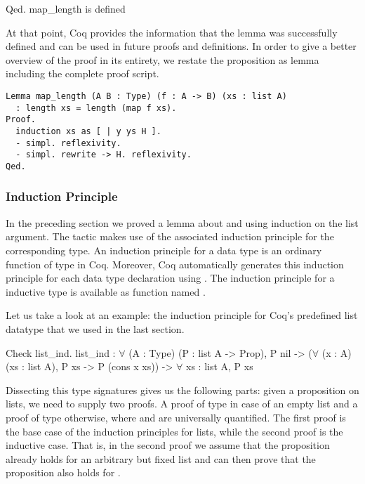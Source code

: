 \begin{cproof}{Qed.}
map_length is defined
\end{cproof}

At that point, Coq provides the information that the lemma  was successfully defined and can be used in future proofs and definitions.
In order to give a better overview of the proof in its entirety, we restate the proposition as lemma including the complete proof script.

\begin{verbatim}
Lemma map_length (A B : Type) (f : A -> B) (xs : list A)
  : length xs = length (map f xs).
Proof.
  induction xs as [ | y ys H ].
  - simpl. reflexivity.
  - simpl. rewrite -> H. reflexivity.
Qed.
\end{verbatim}

\subsubsection{Induction Principle}
\label{subsub:induction}

In the preceding section we proved a lemma about  and  using induction on the list argument.
The  tactic makes use of the associated induction principle for the corresponding type.
An induction principle for a data type is an ordinary function of type  in Coq.
Moreover, Coq automatically generates this induction principle for each data type declaration using .
The induction principle for a inductive type  is available as function named .

Let us take a look at an example: the induction principle for Coq's predefined list datatype that we used in the last section.

\begin{crepl}
\coqrepl Check list_ind.
  list_ind : \(\forall\) (A : Type) (P : list A -> Prop),
    P nil ->
    (\(\forall\) (x : A) (xs : list A), P xs -> P (cons x xs)) ->
    \(\forall\) xs : list A, P xs
\end{crepl}

Dissecting this type signatures gives us the following parts: given a proposition  on lists, we need to supply two proofs.
A proof of type  in case of an empty list and a proof of type  otherwise, where  and  are universally quantified.
The first proof is the base case of the induction principles for lists, while the second proof is the inductive case.
That is, in the second proof we assume that the proposition already holds for an arbitrary but fixed list  and can then prove that the proposition also holds for .

